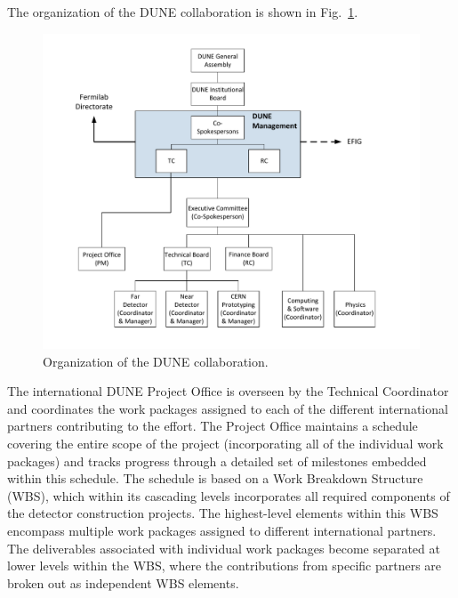 The organization of the DUNE collaboration is shown in Fig.~\ref{fig:DuneOrg}.  
%
\begin{figure}[htb]
  \centering
\includegraphics[scale=0.7]{figures/150530_DUNE_Collaboration_20150525.pdf}
  \caption{Organization of the DUNE collaboration.}
  \label{fig:DuneOrg}
\end{figure}
%
The international DUNE Project Office is overseen by the Technical Coordinator and coordinates the work packages assigned to each 
of the different international partners contributing to the effort.  The Project Office maintains a schedule covering the entire 
scope of the project (incorporating all of the individual work packages) and tracks progress through a detailed set of milestones 
embedded within this schedule.  The schedule is based on a Work Breakdown Structure (WBS), which within its cascading levels 
incorporates all required components of the detector construction projects.  The highest-level elements within this WBS 
encompass multiple work packages assigned to different international partners.  The deliverables associated with individual work 
packages become separated at lower levels within the WBS, where the contributions from specific partners are broken out 
as independent WBS elements.

